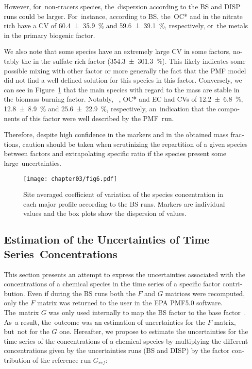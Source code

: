 \begin{otherlanguage}{english}
However, for~non-tracers species, the~dispersion according to the BS and DISP runs could
be larger. For~instance, according to BS, the~OC* and  in the nitrate rich have
a CV of \SI{60.4\pm35.9}{\percent} and \SI{59.6\pm39.1}{\percent}, respectively, or~the
metals in the primary biogenic factor.

We also note that some species have an extremely large CV in some factors, notably the
 in the sulfate rich factor (\SI{354.3\pm301.3}{\percent}). This likely
indicates some possible mixing with other factor or more generally the fact that the PMF
model did not find a well defined solution for this species in this factor. Conversely, we
can see in Figure~\ref{fig:fig6} that the main species with regard to the mass are stable
in the biomass burning factor. Notably,  ~\PM{}, OC* and EC had CVs of
\SI{12.2\pm6.8}{\percent}, \SI{12.8\pm8.9}{\percent} and \SI{25.6\pm22.9}{\percent},
respectively, an~indication that the components of this factor  were well described by the
PMF~run.

Therefore, despite high confidence in the markers and in the obtained mass fractions,
caution should be taken when scrutinizing the repartition of a given species between
factors and extrapolating specific ratio if the species present some large~uncertainties.

\begin{figure}[ht]
    \centering
    \texttt{[image: chapter03/fig6.pdf]}
    \caption{
        Site averaged coefficient of variation of the species concentration in
        each major profile according to the BS runs. Markers are individual
        values and the box plots show  the dispersion of values.
    }
    \label{fig:fig6}
\end{figure}

\subsection{Estimation of the Uncertainties of Time Series~Concentrations}%
\label{sub:estimation_of_the_uncertainties_of_time_series_concentrations}

This section presents an attempt to express the uncertainties associated with the
concentrations of a chemical species in the time series of a specific factor contribution.
Even if during the BS runs both the $F$ and $G$ matrices  were recomputed, only the $F$
matrix was returned to the user in the EPA PMF5.0 software. The~matrix $G$ was only used
internally to map the BS factor to the base factor~\autocite{paateroMethods2014}. As~a
result, the~outcome  was an estimation of uncertainties for the $F$ matrix, but~not for
the $G$ one.  Hereafter, we propose to estimate the uncertainties for the time series of
the concentrations of a chemical species by multiplying the different concentrations given
by the uncertainties runs (BS and DISP) by the factor contribution of the reference run
$G_{ref}$:


\end{otherlanguage}
